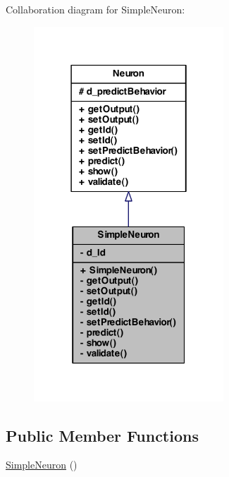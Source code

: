 Collaboration diagram for SimpleNeuron:\nopagebreak
\begin{figure}[H]
\begin{center}
\leavevmode
\includegraphics[width=202pt]{class_simple_neuron__coll__graph}
\end{center}
\end{figure}
\subsection*{Public Member Functions}
\begin{DoxyCompactItemize}
\item 
\hyperlink{class_simple_neuron_a38c2d75287caf6374c1252c35f73dce2}{SimpleNeuron} ()
\end{DoxyCompactItemize}
